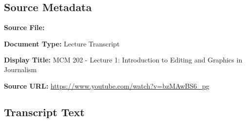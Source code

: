 \subsection*{Source Metadata}
\noindent\textbf{Source File:} \par
\noindent\textbf{Document Type:} Lecture Transcript\par
\noindent\textbf{Display Title:} MCM 202 - Lecture 1: Introduction to Editing and Graphics in Journalism\par
\noindent\textbf{Source URL:} \url{https://www.youtube.com/watch?v=bzMAwBS6_pg}\par

\subsection*{Transcript Text}
